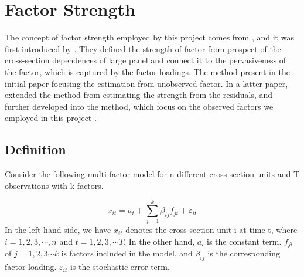 \documentclass[12pt]{article}
\begin{document}
\section{Factor Strength}\label{strength}
The concept of factor strength employed by this project comes from , and it was first introduced by .
They defined the strength of factor from prospect of the cross-section dependences of large panel and connect it to the pervasiveness of the factor, which is captured by the factor loadings.
The method present in the initial paper focusing the estimation from unobserved factor.
In a latter paper,  extended the method from estimating the strength from the residuals, and further developed into the method, which focus on the observed factors we employed in this project \cite{Bailey2020}.

		\subsection{Definition}\label{definiton}

Consider the following multi-factor model for n different cross-section units and T observations with k  factors.

\[  x_{it} = a_{t}+  \sum_{j=1}^{k}\beta_{ij}f_{jt} + \varepsilon_{it} \tag{1}\label{definition_model} \]
In the left-hand side, we have $x_{it}$ denotes the cross-section unit i at time t, where $i = 1, 2,3, \cdots, n$ and $t = 1,2,3, \cdots T$.  
In the other hand, $a_{i}$ is the constant term.
$f_{jt}$ of $j = 1, 2, 3\cdots k$ is factors included in the model, and $\beta_{ij}$ is the corresponding factor loading.
$\varepsilon_{it}$ is the stochastic error term.
\end{document}
